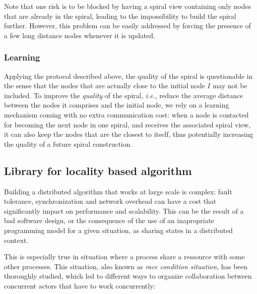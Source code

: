 Note that one risk is to be blocked by having a spiral view containing only
nodes that are already in the spiral, leading to the impossibility to build the
spiral further. However, this problem can be easily addressed by forcing the
presence of a few long distance nodes whenever it is updated.

\subsubsection*{Learning}

Applying the protocol described above, the quality of the spiral is
questionable in the sense that the nodes that are actually close to the initial
node $I$ may not be included.%
%
To improve the \emph{quality} of the spiral, \emph{i.e.}, reduce the average
distance between the nodes it comprises and the initial node, we rely on a
learning mechanism coming with no extra communication cost: when a node is
contacted for becoming the next node in one spiral, and receives the associated
spiral view, it can also keep the nodes that are the closest to itself, thus
potentially increasing the quality of a future spiral construction.

\subsection{Library for locality based algorithm}

Building a distributed algorithm that works at large scale is complex: fault
tolerance, synchronization and network overhead can have a cost that 
significantly impact on performance and scalability. This can be the result of a
bad software design, or the consequence of the use of an inapropriate 
programming model for a given situation, as sharing states in a distributed
context.

This is especially true in situation where a process share a ressource with some 
other processes. This situation, also known as \emph{race condition situation}, 
has been thoroughly studied, which led to different ways to organize 
collaboration between concurrent actors that have to work concurrently:

